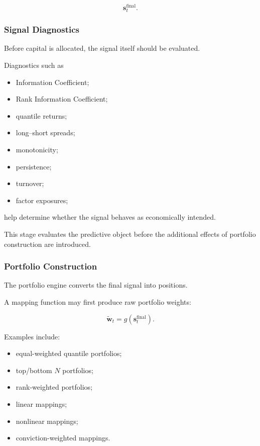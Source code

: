 \documentclass[11pt,a4paper]{article}
\begin{document}
\begin{equation}
\boxed{
\mathbf{s}_t^{\mathrm{final}}.
}
\end{equation}


\subsubsection{Signal Diagnostics}

Before capital is allocated, the signal itself should be evaluated.

Diagnostics such as

\begin{itemize}
    \item Information Coefficient;
    \item Rank Information Coefficient;
    \item quantile returns;
    \item long--short spreads;
    \item monotonicity;
    \item persistence;
    \item turnover;
    \item factor exposures;
\end{itemize}

help determine whether the signal behaves as economically intended.

This stage evaluates the predictive object before the additional effects of
portfolio construction are introduced.


\subsubsection{Portfolio Construction}

The portfolio engine converts the final signal into positions.

A mapping function may first produce raw portfolio weights:

\begin{equation}
\widetilde{\mathbf{w}}_t
=
g
\left(
\mathbf{s}_t^{\mathrm{final}}
\right).
\end{equation}

Examples include:

\begin{itemize}
    \item equal-weighted quantile portfolios;
    \item top/bottom $N$ portfolios;
    \item rank-weighted portfolios;
    \item linear mappings;
    \item nonlinear mappings;
    \item conviction-weighted mappings.
\end{itemize}
\end{document}
